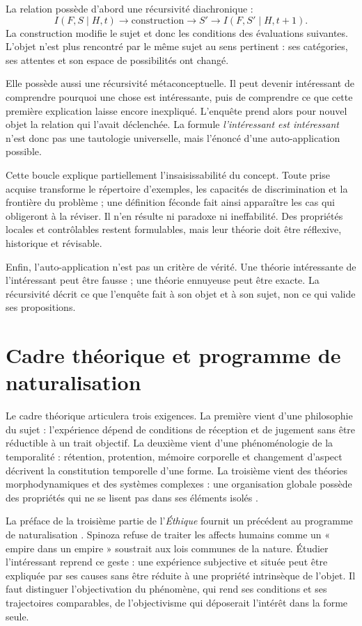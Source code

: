 \documentclass[11pt,a4paper]{article}
\begin{document}
La relation possède d'abord une récursivité diachronique :
\[
  I(F,S\mid H,t)\longrightarrow
  \text{construction}\longrightarrow S'
  \longrightarrow I(F,S'\mid H,t+1).
\]
La construction modifie le sujet et donc les conditions des évaluations
suivantes. L'objet n'est plus rencontré par le même sujet au sens pertinent :
ses catégories, ses attentes et son espace de possibilités ont changé.

Elle possède aussi une récursivité métaconceptuelle. Il peut devenir intéressant
de comprendre pourquoi une chose est intéressante, puis de comprendre ce que
cette première explication laisse encore inexpliqué. L'enquête prend alors pour
nouvel objet la relation qui l'avait déclenchée. La formule
\emph{l'intéressant est intéressant} n'est donc pas une tautologie universelle,
mais l'énoncé d'une auto-application possible.

Cette boucle explique partiellement l'insaisissabilité du concept. Toute prise
acquise transforme le répertoire d'exemples, les capacités de discrimination et
la frontière du problème ; une définition féconde fait ainsi apparaître les cas
qui obligeront à la réviser. Il n'en résulte ni paradoxe ni ineffabilité. Des
propriétés locales et contrôlables restent formulables, mais leur théorie doit
être réflexive, historique et révisable.

Enfin, l'auto-application n'est pas un critère de vérité. Une théorie
intéressante de l'intéressant peut être fausse ; une théorie ennuyeuse peut être
exacte. La récursivité décrit ce que l'enquête fait à son objet et à son sujet,
non ce qui valide ses propositions.

\section{Cadre théorique et programme de naturalisation}

Le cadre théorique articulera trois exigences. La première vient d'une
philosophie du sujet : l'expérience dépend de conditions de réception et de
jugement sans être réductible à un trait objectif. La deuxième vient d'une
phénoménologie de la temporalité : rétention, protention, mémoire corporelle et
changement d'aspect décrivent la constitution temporelle d'une forme. La
troisième vient des théories morphodynamiques et des systèmes complexes : une
organisation globale possède des propriétés qui ne se lisent pas dans ses
éléments isolés
\parencite{petitot1993phenomenologie,petitot2002naturaliser}.

La préface de la troisième partie de l'\emph{Éthique} fournit un précédent au
programme de naturalisation \parencite{spinoza1966ethique}. Spinoza refuse de
traiter les affects humains comme un « empire dans un empire » soustrait aux
lois communes de la nature. Étudier l'intéressant reprend ce geste : une
expérience subjective et située peut être expliquée par ses causes sans être
réduite à une propriété intrinsèque de l'objet. Il faut distinguer
l'objectivation du phénomène, qui rend ses conditions et ses trajectoires
comparables, de l'objectivisme qui déposerait l'intérêt dans la forme seule.
\end{document}
